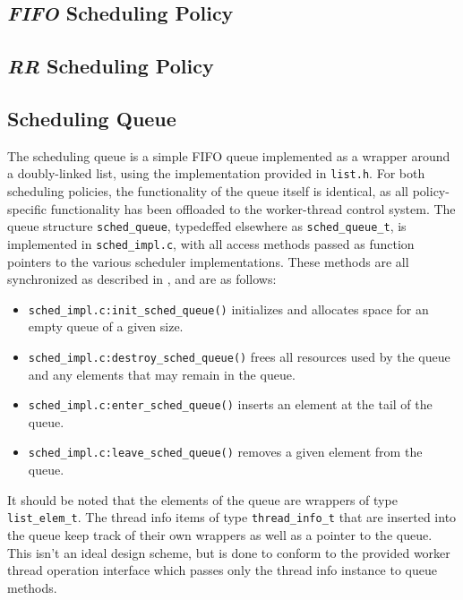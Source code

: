 \documentclass[paper=a4, fontsize=11pt]{scrartcl}
\begin{document}

\subsection*{\textit{FIFO} Scheduling Policy}

\subsection*{\textit{RR} Scheduling Policy}

\subsection*{Scheduling Queue}
The scheduling queue is a simple FIFO queue implemented as a wrapper around a doubly-linked list, using the implementation provided in \texttt{list.h}. For both scheduling policies, the functionality of the queue itself is identical, as all policy-specific functionality has been offloaded to the worker-thread control system. The queue structure \texttt{sched\_queue}, typedeffed elsewhere as \texttt{sched\_queue\_t}, is implemented in \texttt{sched\_impl.c}, with all access methods passed as function pointers to the various scheduler implementations. These methods are all synchronized as described in \textbf{}, and are as follows:

\begin{itemize}
  \item \texttt{sched\_impl.c:init\_sched\_queue()} initializes and allocates space for an empty queue of a given size.
  \item \texttt{sched\_impl.c:destroy\_sched\_queue()} frees all resources used by the queue and any elements that may remain in the queue.
  \item \texttt{sched\_impl.c:enter\_sched\_queue()} inserts an element at the tail of the queue.
  \item \texttt{sched\_impl.c:leave\_sched\_queue()} removes a given element from the queue.
\end{itemize}

It should be noted that the elements of the queue are wrappers of type \texttt{list\_elem\_t}. The thread info items of type \texttt{thread\_info\_t} that are inserted into the queue keep track of their own wrappers as well as a pointer to the queue. This isn't an ideal design scheme, but is done to conform to the provided worker thread operation interface which passes only the thread info instance to queue methods.
\end{document}
